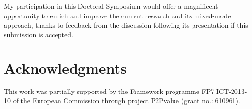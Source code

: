 \documentclass{sig-alternate}
\begin{document}
My participation in this Doctoral Symposium would offer a magnificent opportunity to enrich and improve the current research and its mixed-mode approach, thanks to  feedback from the discussion following its presentation if this submission is accepted.


\section{Acknowledgments}
This work was partially supported by the Framework
programme FP7 ICT-2013-10 of the European Commission through project
P2Pvalue (grant no.: 610961).



\end{document}

